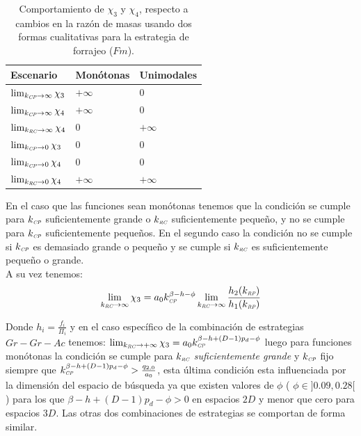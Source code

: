 \begin{table}

\caption{Comportamiento de $\chi_3$ y $\chi_4$, respecto a cambios en la raz\'on de masas usando dos formas cualitativas para la estrategia de forrajeo ($Fm$).}
\begin{center}
\begin{tabular}{p{1.5in}|m{1.5in}|m{1.5in}} 
 Escenario & Mon\'otonas  & Unimodales \\
\hline
$\lim_{k_{\textit{\tiny CP}} \to \infty} \chi_3$ & $+\infty$  & 0 \\
$\lim_{k_{\textit{\tiny CP}} \to \infty} \chi_4$ & $+\infty$  & 0 \\
$\lim_{k_{\textit{\tiny RC}} \to \infty} \chi_4$ & 0  & $+\infty$ \\
$\lim_{k_{\textit{\tiny CP}} \to 0} \chi_3$ & 0 & 0 \\
$\lim_{k_{\textit{\tiny CP}} \to 0} \chi_4$ & 0 & 0 \\
$\lim_{k_{\textit{\tiny RC}} \to 0} \chi_4$ & $+\infty$ & $+\infty$ \\
\hline

\end{tabular}
\end{center}
\end{table}

En el caso que las funciones sean mon\'otonas tenemos que la condici\'on se cumple para $k_{\textit{\tiny CP}}$ suficientemente grande o  $k_{\textit{\tiny RC}}$ suficientemente peque\~no, y no se cumple para $k_{\textit{\tiny CP}}$ suficientemente peque\~nos. En el segundo caso la condici\'on no se cumple si $k_{\textit{\tiny CP}}$ es demasiado grande o peque\~no y se cumple si $k_{\textit{\tiny RC}}$ es suficientemente peque\~no o grande.\\

A su vez tenemos:
\begin{equation}
  \lim_{k_{\textit{\tiny RC}} \to \infty} \chi_3 = a_0 k_{\textit{\tiny CP}}^{\beta - h - \phi} \lim_{k_{\textit{\tiny RC}} \to \infty} \frac{h_2(k_{\textit{\tiny RP}})}{h_1(k_{\textit{\tiny RP}})} 
\end{equation}

Donde $h_i = \frac{f_i}{\Pi_i}$ y en el caso espec\'ifico de la combinaci\'on de estrategias $Gr-Gr-Ac$ tenemos: $\lim_{k_{\textit{\tiny RC}} \to +\infty} \chi_3 = a_0 k_{\textit{\tiny CP}}^{\beta -h + (D-1)p_d - \phi}$ luego para funciones mon\'otonas la condici\'on se cumple para $k_{\textit{\tiny RC}}$ \emph{suficientemente grande} y $k_{\textit{\tiny CP}}$ fijo siempre que $k_{\textit{\tiny CP}}^{\beta - h + (D-1)p_d - \phi} > \frac{q_{2,0}}{a_0}$, esta \'ultima condici\'on esta influenciada por la dimensi\'on del espacio de b\'usqueda ya que existen valores de $\phi$ ( $\phi \in ]0.09, 0.28[$) para los que $ \beta - h + (D-1)p_d - \phi >0$ en espacios $2D$ y menor que cero para espacios $3D$. Las otras dos combinaciones de estrategias se comportan de forma similar.\\

